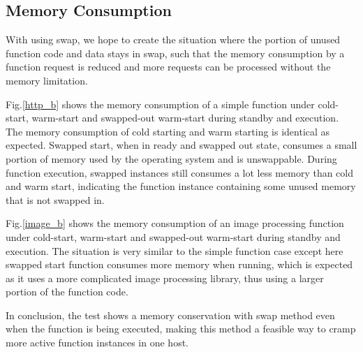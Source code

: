 \documentclass[conference]{IEEEtran}
\begin{document}
\subsection{Memory Consumption}
With using swap, we hope to create the situation where the portion of unused function code and data stays in swap, such that the memory consumption by a function request is reduced and more requests can be processed without the memory limitation. 

Fig.\ref{http_b} shows the memory consumption of a simple function under cold-start, warm-start and swapped-out warm-start during standby and execution. The memory consumption of cold starting and warm starting is identical as expected. Swapped start, when in ready and swapped out state, consumes a small portion of memory used by the operating system and is unswappable. During function execution, swapped instances still consumes a lot less memory than cold and warm start, indicating the function instance containing some unused memory that is not swapped in.

Fig.\ref{image_b} shows the memory consumption of an image processing function under cold-start, warm-start and swapped-out warm-start during standby and execution. The situation is very similar to the simple function case except here swapped start function consumes more memory when running, which is expected as it uses a more complicated image processing library, thus using a larger portion of the function code.

In conclusion, the test shows a memory conservation with swap method even when the function is being executed, making this method a feasible way to cramp more active function instances in one host.
\end{document}
